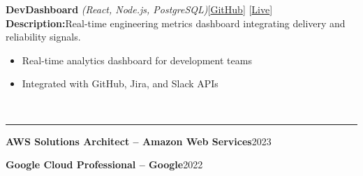 \documentclass[letterpaper,11pt]{article}
\begin{document}
\par\vspace{3pt}
\textbf{DevDashboard} \textit{(React, Node.js, PostgreSQL)}\hfill {\color{cyan}[\href{\detokenize{https://github.com/example/devdashboard}}{GitHub}]} {\color{cyan}[\href{\detokenize{https://devdashboard.example.com}}{Live}]}\\
\textbf{Description:}\quad Real-time engineering metrics dashboard integrating delivery and reliability signals.\\
\begin{itemize}
  \item Real-time analytics dashboard for development teams
  \item Integrated with GitHub, Jira, and Slack APIs
\end{itemize}
\par\vspace{3pt}
\par\vspace{6pt}
\par
{}\\
\vspace{2pt}\hrule\vspace{4pt}
\textbf{AWS Solutions Architect -- Amazon Web Services}\hfill 2023\\
\par\vspace{2pt}
\textbf{Google Cloud Professional -- Google}\hfill 2022\\
\par\vspace{2pt}
\par\vspace{6pt}
\end{document}
